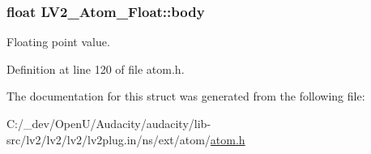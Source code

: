 \subsubsection[{\texorpdfstring{body}{body}}]{\setlength{\rightskip}{0pt plus 5cm}float L\+V2\+\_\+\+Atom\+\_\+\+Float\+::body}\hypertarget{struct_l_v2___atom___float_a7a13def55ea33c5d18883815c9809441}{}\label{struct_l_v2___atom___float_a7a13def55ea33c5d18883815c9809441}
Floating point value. 

Definition at line 120 of file atom.\+h.



The documentation for this struct was generated from the following file\+:\begin{DoxyCompactItemize}
\item 
C\+:/\+\_\+dev/\+Open\+U/\+Audacity/audacity/lib-\/src/lv2/lv2/lv2/lv2plug.\+in/ns/ext/atom/\hyperlink{atom_8h}{atom.\+h}\end{DoxyCompactItemize}
